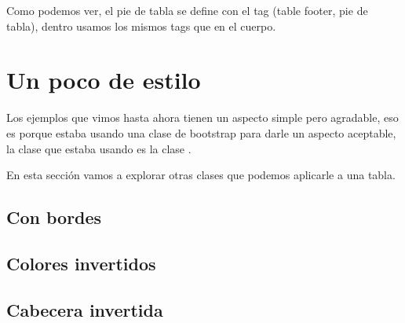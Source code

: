 \documentclass[letterpaper,10pt,spanish]{sphinxmanual}
\begin{document}
Como podemos ver, el pie de tabla se define con el tag  (table footer,
pie de tabla), dentro usamos los mismos tags que en el cuerpo.


\section{Un poco de estilo}
\label{\detokenize{hay-tabla:un-poco-de-estilo}}
Los ejemplos que vimos hasta ahora tienen un aspecto simple pero agradable,
eso es porque estaba usando una clase de bootstrap para darle un aspecto
aceptable, la clase que estaba usando es la clase .

%
\begin{sphinxVerbatim}[commandchars=\\\{\}]
 
\end{sphinxVerbatim}

En esta sección vamos a explorar otras clases que podemos aplicarle a una
tabla.


\subsection{Con bordes}
\label{\detokenize{hay-tabla:con-bordes}}
%
\begin{sphinxVerbatim}[commandchars=\\\{\}]
 
\end{sphinxVerbatim}




\subsection{Colores invertidos}
\label{\detokenize{hay-tabla:colores-invertidos}}
%
\begin{sphinxVerbatim}[commandchars=\\\{\}]
 
\end{sphinxVerbatim}




\subsection{Cabecera invertida}
\label{\detokenize{hay-tabla:cabecera-invertida}}
%
\begin{sphinxVerbatim}[commandchars=\\\{\}]
 
   
\end{sphinxVerbatim}
\end{document}
